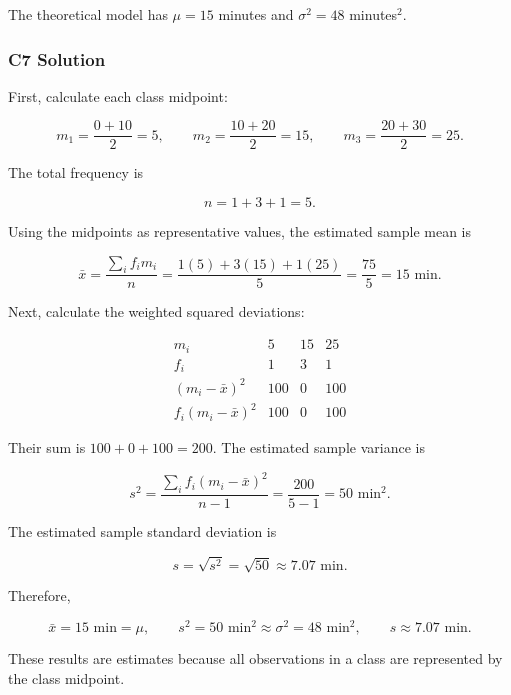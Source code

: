 The theoretical model has $\mu=15$ minutes and
$\sigma^2=48$ minutes$^2$.


\subsubsection*{C7 Solution}
\label{subsec:c7-only-grouped-solution}

First, calculate each class midpoint:

\[
m_1=\frac{0+10}{2}=5,\qquad
m_2=\frac{10+20}{2}=15,\qquad
m_3=\frac{20+30}{2}=25.
\]

The total frequency is

\[
n=1+3+1=5.
\]

Using the midpoints as representative values, the estimated sample mean is

\[
\bar{x}
=\frac{\sum_i f_i m_i}{n}
=\frac{1(5)+3(15)+1(25)}{5}
=\frac{75}{5}
=15\text{ min}.
\]

Next, calculate the weighted squared deviations:

\[
\begin{array}{c|ccc}
	m_i & 5 & 15 & 25 \\ \hline
	f_i & 1 & 3 & 1 \\
	(m_i-\bar{x})^2 & 100 & 0 & 100 \\
	f_i(m_i-\bar{x})^2 & 100 & 0 & 100
\end{array}
\]

Their sum is $100+0+100=200$. The estimated sample variance is

\[
s^2
=\frac{\sum_i f_i(m_i-\bar{x})^2}{n-1}
=\frac{200}{5-1}
=50\text{ min}^2.
\]

The estimated sample standard deviation is

\[
s=\sqrt{s^2}=\sqrt{50}\approx7.07\text{ min}.
\]

Therefore,

\[
\boxed{\bar{x}=15\text{ min}=\mu,\qquad
s^2=50\text{ min}^2\approx\sigma^2=48\text{ min}^2,\qquad
s\approx7.07\text{ min}.}
\]

These results are estimates because all observations in a class are
represented by the class midpoint.


